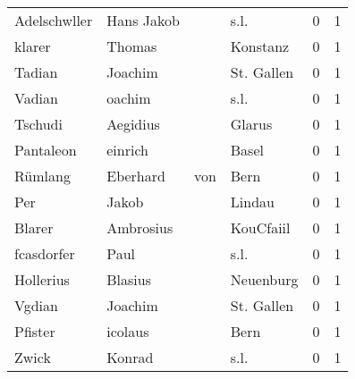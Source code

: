 \documentclass[10pt,a4paper,landscape]{article}
\begin{document}
\begin{longtable}{llllrr}
             Adelschwller &                         Hans Jakob &             &                                        s.l. &          0 &         1 \\
                   klarer &                             Thomas &             &                                    Konstanz &          0 &         1 \\
                   Tadian &                            Joachim &             &                                  St. Gallen &          0 &         1 \\
                   Vadian &                             oachim &             &                                        s.l. &          0 &         1 \\
                  Tschudi &                           Aegidius &             &                                      Glarus &          0 &         1 \\
                Pantaleon &                            einrich &             &                                       Basel &          0 &         1 \\
                  Rümlang &                           Eberhard &         von &                                        Bern &          0 &         1 \\
                      Per &                              Jakob &             &                                      Lindau &          0 &         1 \\
                   Blarer &                          Ambrosius &             &                                   KouCfaiil &          0 &         1 \\
               fcasdorfer &                               Paul &             &                                        s.l. &          0 &         1 \\
                Hollerius &                            Blasius &             &                                   Neuenburg &          0 &         1 \\
                   Vgdian &                            Joachim &             &                                  St. Gallen &          0 &         1 \\
                  Pfister &                            icolaus &             &                                        Bern &          0 &         1 \\
                    Zwick &                             Konrad &             &                                        s.l. &          0 &         1 \\

\end{longtable}
\end{document}
